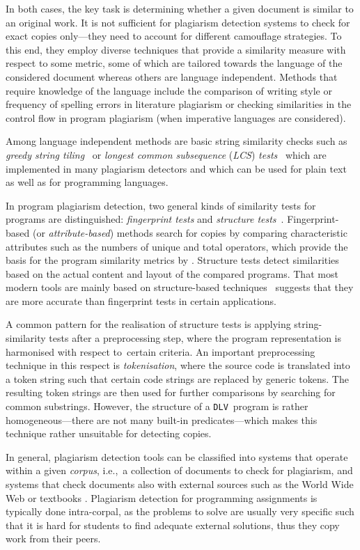 \documentclass{tlp}
\newcommand{\dlv}{\texttt{DLV}\xspace}
\newcommand{\wrt}[0]{with respect to}
\newcommand{\iec}[0]{i.e.,\ }
\begin{document}
In both cases, the key task is determining whether a given document 
is similar to an original work.
It is not sufficient for plagiarism detection systems to check for  exact copies only---they need to account
for different camouflage strategies. 
To this end, they employ diverse techniques that
provide a similarity measure with respect to some metric,
some of which are tailored towards the language of the considered document 
whereas others are language independent.
Methods that require knowledge of the language include the
comparison of writing style or frequency of spelling errors in literature plagiarism or checking similarities in the control flow in program plagiarism (when imperative languages are considered).

Among language independent methods are basic string similarity checks 
such as \emph{greedy string tiling}~\cite{greedy93} or \emph{longest common subsequence} (\emph{LCS}) \emph{tests}~\cite{bergroth00} which
are implemented in many plagiarism detectors and which can be used for plain text as well as for  programming languages.

In program plagiarism detection, two general kinds of similarity tests for programs are distinguished:
\emph{fingerprint tests} and \emph{structure tests}~\cite{whale90}.
Fingerprint-based (or \emph{attribute-based}) methods search for copies by comparing characteristic attributes
such as the numbers of unique and total operators,
which provide the basis for the program similarity metrics by .
Structure tests detect similarities based on the actual content and layout of the compared programs.
That most modern tools are mainly based on structure-based techniques~\cite{VercoWise96,Mozgovoy08} suggests
that they are  more accurate than fingerprint tests in certain applications.

A common pattern for the realisation of structure tests is applying string-similarity tests after
a preprocessing step, where the program representation is harmonised \wrt\ certain criteria.
An important preprocessing technique in this respect is \emph{tokenisation},
where the source code is translated into a token string such that certain code strings are replaced by generic tokens.
The resulting token strings are then used for further comparisons by searching for common substrings. However, 
the structure of a \dlv\ program is rather homogeneous---there are not many built-in predicates---which makes this technique rather unsuitable for detecting copies.

In general, plagiarism detection tools can be classified into systems that
operate within a given \emph{corpus}, \iec a collection of documents to check for plagiarism,
and systems that check documents also with external sources such as the World Wide Web
or textbooks \cite{lancaster-classifications}.
Plagiarism detection for programming assignments is typically done intra-corpal,
as the problems to solve are usually very specific such that it is hard for 
students to find adequate external solutions, thus they copy work from their peers.
\end{document}
